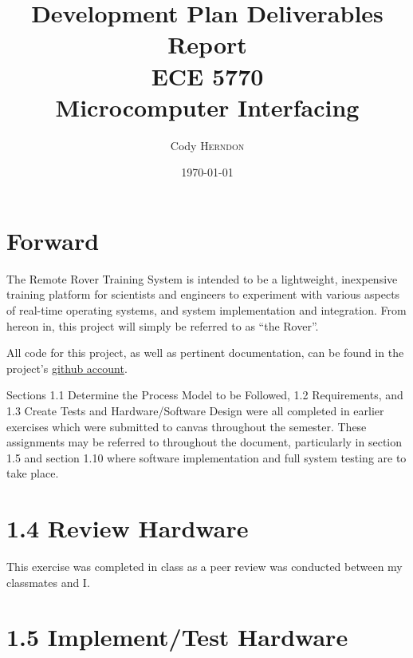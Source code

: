 \documentclass{article}
\title{Development Plan Deliverables Report \\ ECE 5770 \\ Microcomputer Interfacing} %
\author{Cody \textsc{Herndon}} %
\date{\today} %
\begin{document}
\maketitle %


\section*{Forward}

The Remote Rover Training System is intended to be a lightweight, inexpensive training platform for scientists and engineers to experiment with various aspects of real-time operating systems, and system implementation and integration.  From hereon in, this project will simply be referred to as ``the Rover''.

All code for this project, as well as pertinent documentation, can be found in the project's \href{http://www.github.com/Shamshel/ECE5770}{github account}.

Sections 1.1 Determine the Process Model to be Followed, 1.2 Requirements, and 1.3 Create Tests and Hardware/Software Design were all completed in earlier exercises which were submitted to canvas throughout the semester.  These assignments may be referred to throughout the document, particularly in section 1.5 and section 1.10 where software implementation and full system testing are to take place.


\section*{1.4 Review Hardware}

This exercise was completed in class as a peer review was conducted between my classmates and I.


\section*{1.5 Implement/Test Hardware}
\end{document}
